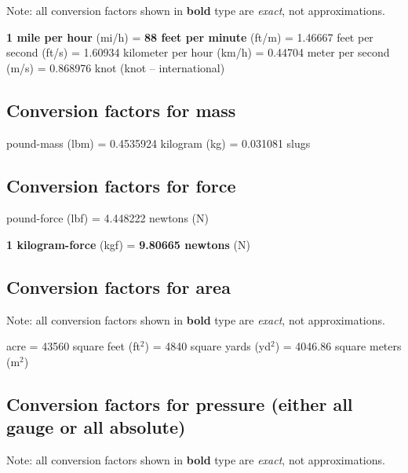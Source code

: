 Note: all conversion factors shown in \textbf{bold} type are \textit{exact}, not approximations.

\vskip 10pt

\noindent 
\textbf{1 mile per hour} (mi/h) = \textbf{88 feet per minute} (ft/m) = 1.46667 feet per second (ft/s) = 1.60934 kilometer per hour (km/h) = 0.44704 meter per second (m/s) = 0.868976 knot (knot -- international)





\filbreak
\subsection{Conversion factors for mass}

 pound-mass (lbm) = 0.4535924 kilogram (kg) = 0.031081 slugs




\filbreak
\subsection{Conversion factors for force}

 pound-force (lbf) = 4.448222 newtons (N)

\vskip 10pt

\noindent 
\textbf{1 kilogram-force} (kgf) = \textbf{9.80665 newtons} (N)




\filbreak
\subsection{Conversion factors for area}

Note: all conversion factors shown in \textbf{bold} type are \textit{exact}, not approximations.

\vskip 10pt

 acre = 43560 square feet (ft$^{2}$) = 4840 square yards (yd$^{2}$) = 4046.86 square meters (m$^{2}$)





\filbreak
\subsection{Conversion factors for pressure (either all gauge or all absolute)}

Note: all conversion factors shown in \textbf{bold} type are \textit{exact}, not approximations.

